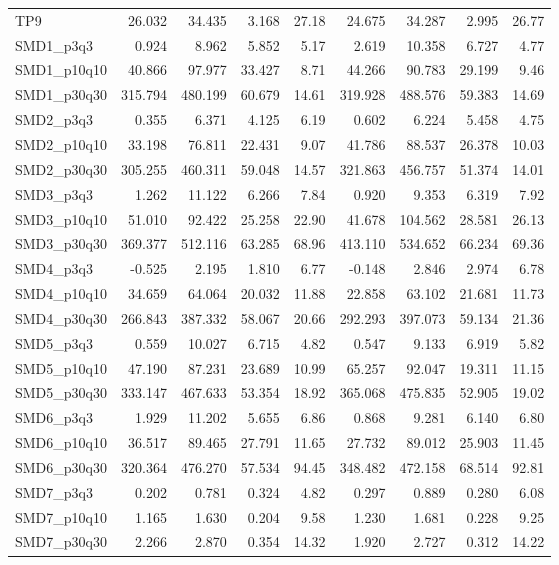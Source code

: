 \begin{longtable}{lrrrrrrrr}
TP9 & 26.032 & 34.435 & 3.168 & 27.18 & 24.675 & 34.287 & 2.995 & 26.77 \\
SMD1\_p3q3 & 0.924 & 8.962 & 5.852 & 5.17 & 2.619 & 10.358 & 6.727 & 4.77 \\
SMD1\_p10q10 & 40.866 & 97.977 & 33.427 & 8.71 & 44.266 & 90.783 & 29.199 & 9.46 \\
SMD1\_p30q30 & 315.794 & 480.199 & 60.679 & 14.61 & 319.928 & 488.576 & 59.383 & 14.69 \\
SMD2\_p3q3 & 0.355 & 6.371 & 4.125 & 6.19 & 0.602 & 6.224 & 5.458 & 4.75 \\
SMD2\_p10q10 & 33.198 & 76.811 & 22.431 & 9.07 & 41.786 & 88.537 & 26.378 & 10.03 \\
SMD2\_p30q30 & 305.255 & 460.311 & 59.048 & 14.57 & 321.863 & 456.757 & 51.374 & 14.01 \\
SMD3\_p3q3 & 1.262 & 11.122 & 6.266 & 7.84 & 0.920 & 9.353 & 6.319 & 7.92 \\
SMD3\_p10q10 & 51.010 & 92.422 & 25.258 & 22.90 & 41.678 & 104.562 & 28.581 & 26.13 \\
SMD3\_p30q30 & 369.377 & 512.116 & 63.285 & 68.96 & 413.110 & 534.652 & 66.234 & 69.36 \\
SMD4\_p3q3 & -0.525 & 2.195 & 1.810 & 6.77 & -0.148 & 2.846 & 2.974 & 6.78 \\
SMD4\_p10q10 & 34.659 & 64.064 & 20.032 & 11.88 & 22.858 & 63.102 & 21.681 & 11.73 \\
SMD4\_p30q30 & 266.843 & 387.332 & 58.067 & 20.66 & 292.293 & 397.073 & 59.134 & 21.36 \\
SMD5\_p3q3 & 0.559 & 10.027 & 6.715 & 4.82 & 0.547 & 9.133 & 6.919 & 5.82 \\
SMD5\_p10q10 & 47.190 & 87.231 & 23.689 & 10.99 & 65.257 & 92.047 & 19.311 & 11.15 \\
SMD5\_p30q30 & 333.147 & 467.633 & 53.354 & 18.92 & 365.068 & 475.835 & 52.905 & 19.02 \\
SMD6\_p3q3 & 1.929 & 11.202 & 5.655 & 6.86 & 0.868 & 9.281 & 6.140 & 6.80 \\
SMD6\_p10q10 & 36.517 & 89.465 & 27.791 & 11.65 & 27.732 & 89.012 & 25.903 & 11.45 \\
SMD6\_p30q30 & 320.364 & 476.270 & 57.534 & 94.45 & 348.482 & 472.158 & 68.514 & 92.81 \\
SMD7\_p3q3 & 0.202 & 0.781 & 0.324 & 4.82 & 0.297 & 0.889 & 0.280 & 6.08 \\
SMD7\_p10q10 & 1.165 & 1.630 & 0.204 & 9.58 & 1.230 & 1.681 & 0.228 & 9.25 \\
SMD7\_p30q30 & 2.266 & 2.870 & 0.354 & 14.32 & 1.920 & 2.727 & 0.312 & 14.22 \\

\end{longtable}
